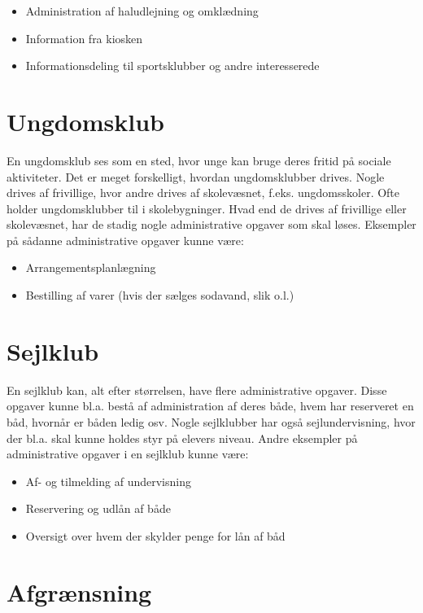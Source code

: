 \begin{itemize}
  \item Administration af haludlejning og omklædning 
  \item Information fra kiosken
  \item Informationsdeling til sportsklubber og andre interesserede
\end{itemize}


\section{Ungdomsklub}

En ungdomsklub ses som en sted, hvor unge kan bruge deres fritid på sociale aktiviteter. Det er meget
forskelligt, hvordan ungdomsklubber drives. Nogle drives af frivillige, hvor andre drives af skolevæsnet\citep{ung1},
f.eks. ungdomsskoler. Ofte holder ungdomsklubber til i skolebygninger. Hvad end de drives af frivillige eller
skolevæsnet, har de stadig nogle administrative opgaver som skal løses. Eksempler på sådanne administrative
opgaver kunne være:

\begin{itemize}
  \item Arrangementsplanlægning
  \item Bestilling af varer (hvis der sælges sodavand, slik o.l.)
\end{itemize}

\section{Sejlklub}

En sejlklub kan, alt efter størrelsen, have flere administrative opgaver. Disse opgaver kunne bl.a. bestå af
administration af deres både, hvem har reserveret en båd, hvornår er båden ledig osv. Nogle sejlklubber har
også sejlundervisning, hvor der bl.a. skal kunne holdes styr på elevers niveau. Andre eksempler på
administrative opgaver i en sejlklub kunne være:

\begin{itemize}
  \item Af- og tilmelding af undervisning
  \item Reservering og udlån af både
  \item Oversigt over hvem der skylder penge for lån af båd
\end{itemize}

\section{Afgrænsning}

